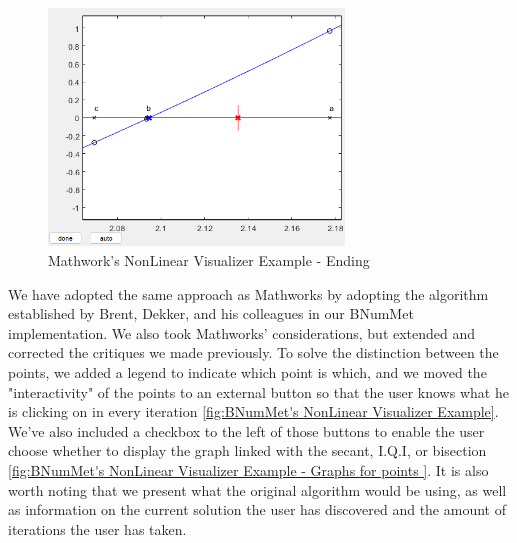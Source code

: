 \begin{figure}[H]
    \centering
    \includegraphics[width=0.7\textwidth]{Include/Images/Thesis/Development/Visualizers/NON LINEAR VISUALIZER/Mathworks.NonLinear.Ex1.1.png}
    \caption{Mathwork's NonLinear Visualizer Example - Ending}
    \label{fig:Mathwork's NonLinear Visualizer Example - Ending}
\end{figure}

We have adopted the same approach as Mathworks by adopting the algorithm established by Brent, Dekker, and his colleagues in our BNumMet implementation. We also took Mathworks' considerations, but extended and corrected the critiques we made previously. To solve the distinction between the points, we added a legend to indicate which point is which, and we moved the "interactivity" of the points to an external button so that the user knows what he is clicking on in every iteration \ref{fig:BNumMet's NonLinear Visualizer Example}. We've also included a checkbox to the left of those buttons to enable the user choose whether to display the graph linked with the secant, I.Q.I, or bisection \ref{fig:BNumMet's NonLinear Visualizer Example - Graphs for points }. It is also worth noting that we present what the original algorithm would be using, as well as information on the current solution the user has discovered and the amount of iterations the user has taken.


